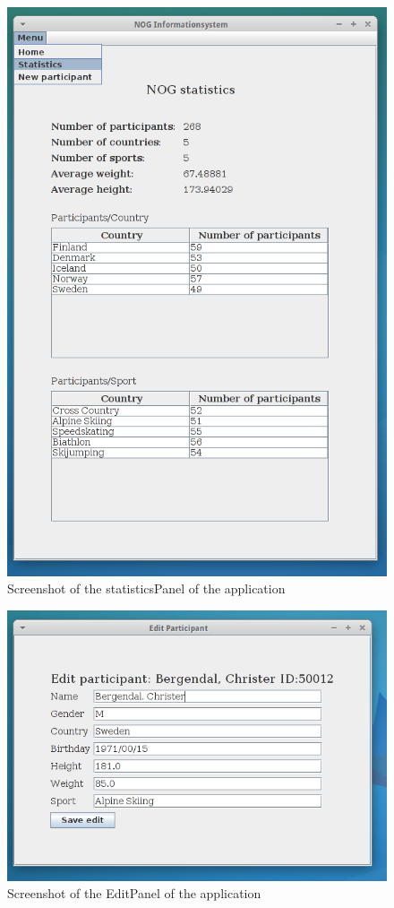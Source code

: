 \documentclass[a4paper, 11pt]{article}
\begin{document}
\begin{figure}[H]
\includegraphics[scale=0.60]{assignment1_3.png}
\caption{Screenshot of the statisticsPanel of the application}
\end{figure}
\begin{figure}[H]
\includegraphics[scale=0.60]{assignment1_5.png}
\caption{Screenshot of the EditPanel of the application}
\end{figure}
\end{document}
